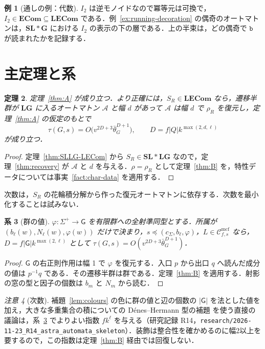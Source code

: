 \documentclass[11pt,a4paper]{ltjsarticle}
\numberwithin{equation}{section}
\theoremstyle{plain}
\newtheorem{theorem}{定理}[section]
\newtheorem{corollary}[theorem]{系}
\theoremstyle{definition}
\newtheorem{example}[theorem]{例}
\theoremstyle{remark}
\newtheorem{remark}[theorem]{注意}
\theoremstyle{plain}
\newcommand{\Cmcf}[2]{\mathcal{C}^{\mathrm{mcf}}_{#1,#2}}
\newcommand{\LG}{\mathbf{LG}}
\newcommand{\SL}{\mathbf{SL}}
\newcommand{\Gp}{\mathbf{G}}
\newcommand{\ECom}{\mathbf{ECom}}
\newcommand{\LECom}{\mathbf{L}\mathbf{ECom}}
\newcommand{\bth}{\bar\theta}
\begin{document}
\begin{example}[通しの例：代数]
\label{ex:running-algebra}
$I_2$ は逆モノイドなので冪等元は可換で，$I_2\in\ECom\subseteq\LECom$ である．例~\ref{ex:running-decoration} の偶奇のオートマトンは，$\SL*\Gp$ における $I_2$ の表示の下の層である．上の半束は，どの偶奇で $\mathtt b$ が読まれたかを記録する．
\end{example}

\section{主定理と系}
\label{sec:main}

\begin{theorem}
\label{thm:main}
定理~\ref{thm:A} が成り立つ．より正確には，$S_R\in\LECom$ なら，遷移半群が $\LG$ に入るオートマトン $\mathcal A$ と幅 $d$ があって $\mathcal A$ は幅 $d$ で $\rho_R$ を復元し，定理~\ref{thm:A} の仮定のもとで
\[
  \tau(G,s)=O\bigl(v^{2D+3}\bth_G^{D+1}\bigr),\qquad D=f|Q|k^{\max(2,d,\ell)}
\]
が成り立つ．
\end{theorem}

\begin{proof}
定理~\ref{thm:SLLG-LECom} から $S_R\in\SL*\LG$ なので，定理~\ref{thm:recovery} が $\mathcal A$ と $d$ を与える．$\rho=\rho_R$ として定理~\ref{thm:B} を，特性データについては事実~\ref{fact:char-data} を適用する．
\end{proof}

次数は，$S_R$ の花輪積分解から作った復元オートマトンに依存する．次数を最小化することは試みない．

\begin{corollary}[群の値]
\label{cor:group}
$\varphi:\Sigma^+\to\mathsf G$ を有限群への全射準同型とする．所属が $(b_\ell(w),N_\ell(w),\varphi(w))$ だけで決まり，$s\preceq(c_\Sigma,b_\ell,\varphi)$，$L\in\Cmcf{f}{s}$ なら，$D=f|\mathsf G|k^{\max(2,\ell)}$ として $\tau(G,s)=O(v^{2D+3}\bth_G^{D+1})$．
\end{corollary}

\begin{proof}
$\mathsf G$ の右正則作用は幅 1 で $\varphi$ を復元する．入口 $p$ から出口 $q$ へ読んだ成分の値は $p^{-1}q$ である．その遷移半群は群である．定理~\ref{thm:B} を適用する．射影の窓の型と因子の個数は $b_m$ と $N_m$ から読む．
\end{proof}

\begin{remark}[次数]
\label{rem:degree}
補題~\ref{lem:colours} の色に群の値と辺の個数の $|\mathsf G|$ を法とした値を加え，大きな多重集合の積についての Dénes--Hermann 型の補題 \cite{DenesHermann1982} を使う直接の議論は，系~\ref{cor:group} でよりよい指数 $fk^\ell$ を与える（研究記録 R14，\texttt{research/2026-11-23\_R14\_astra\_automata\_skeleton}）．装飾は整合性を確かめるのに幅2以上を要するので，この指数は定理~\ref{thm:B} 経由では回復しない．
\end{remark}
\end{document}
